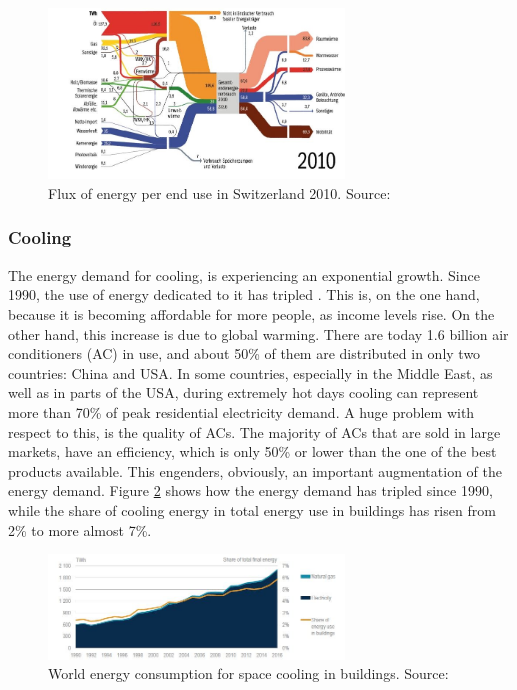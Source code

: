 \documentclass{article}
\begin{document}
\begin{figure}[h!]
\centering
\includegraphics[width=0.7\textwidth]{CH_heat.JPG}
\caption{Flux of energy per end use in Switzerland 2010. Source: \cite{bacherEnergieRespektSchlusselFur2014}}
\label{fig:CH_heat}
\end{figure}

\subsubsection{Cooling}
The energy demand for cooling, is experiencing an exponential growth. Since 1990, the use of energy dedicated to it has tripled \cite{birolFutureCooling2018}. This is, on the one hand, because it is becoming affordable for more people, as income levels rise. On the other hand, this increase is due to global warming. 
There are today 1.6 billion air conditioners (AC) in use, and about 50\% of them are distributed in only two countries: China and USA. In some countries, especially in the Middle East, as well as in parts of the USA, during extremely hot days cooling can represent more than 70\% of peak residential electricity demand. A huge problem with respect to this, is the quality of ACs. The majority of ACs that are sold in large markets, have an efficiency, which is only 50\% or lower than the one of the best products available. This engenders, obviously, an important augmentation of the energy demand. Figure \ref{fig:cooling_energy} shows how the energy demand has tripled since 1990, while the share of cooling energy in total energy use in buildings has risen from 2\% to more almost 7\%. \\ 

\begin{figure}[h!]
\centering
\includegraphics[width=0.7\textwidth]{cooling_energy.JPG}
\caption{World energy consumption for space cooling in buildings. Source:\cite{birolFutureCooling2018}}
\label{fig:cooling_energy}
\end{figure}
\end{document}
